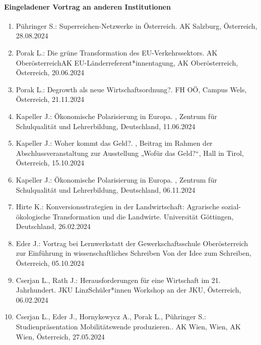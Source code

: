 \paragraph{Eingeladener Vortrag an anderen Institutionen}
\begin{enumerate}
	\item Pühringer S.: Superreichen-Netzwerke in Österreich. AK Salzburg, Österreich, 28.08.2024
	\item Porak L.: Die grüne Transformation des EU-Verkehrssektors. AK OberösterreichAK EU-Länderreferent*innentagung, AK Oberösterreich, Österreich, 20.06.2024
	\item Porak L.: Degrowth als neue Wirtschaftsordnung?. FH OÖ, Campus Wels, Österreich, 21.11.2024
	\item Kapeller J.: Ökonomische Polarisierung in Europa. , Zentrum für Schulqualität und Lehrerbildung, Deutschland, 11.06.2024
	\item Kapeller J.: Woher kommt das Geld?. , Beitrag im Rahmen der Abschlussveranstaltung zur Ausstellung „Wofür das Geld?“, Hall in Tirol, Österreich, 15.10.2024
	\item Kapeller J.: Ökonomische Polarisierung in Europa. , Zentrum für Schulqualität und Lehrerbildung, Deutschland, 06.11.2024
	\item Hirte K.: Konversionsstrategien in der Landwirtschaft: Agrarische sozial-ökologische Transformation und die Landwirte. Universität Göttingen, Deutschland, 26.02.2024
	\item Eder J.: Vortrag bei Lernwerkstatt der Gewerkschaftsschule Oberösterreich zur Einführung in wissenschaftliches Schreiben \glqq Von der Idee zum Schreiben\grqq{}, Österreich, 05.10.2024
	\item Cserjan L., Rath J.: Herausforderungen für eine Wirtschaft im 21. Jahrhundert. JKU LinzSchüler*innen Workshop an der JKU, Österreich, 06.02.2024
	\item Cserjan L., Eder J., Hornykewycz A., Porak L., Pühringer S.: Studienpräsentation \glqq Mobilitätswende produzieren\grqq{}.. AK Wien, Wien, AK Wien, Österreich, 27.05.2024
\end{enumerate}
